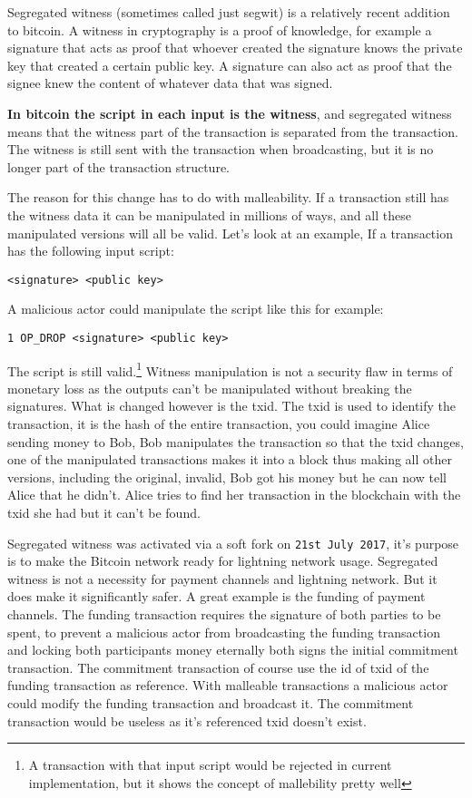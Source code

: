 Segregated witness (sometimes called just segwit) is a relatively recent addition to bitcoin. A witness in cryptography is a proof of knowledge, for example a signature that acts as proof that whoever created the signature knows the private key that created a certain public key. A signature can also act as proof that the signee knew the content of whatever data that was signed.

\textbf{In bitcoin the script in each input is the witness}, and segregated witness means that the witness part of the transaction is separated from the transaction. The witness is still sent with the transaction when broadcasting, but it is no longer part of the transaction structure.

The reason for this change has to do with malleability. If a transaction still has the witness data it can be manipulated in millions of ways, and all these manipulated versions will all be valid. Let's look at an example, If a transaction has the following input script:

\texttt{<signature> <public key>}

A malicious actor could manipulate the script like this for example:

\texttt{1 OP\_DROP <signature> <public key>}

The script is still valid.\footnote{A transaction with that input script would be rejected in current implementation, but it shows the concept of mallebility pretty well} Witness manipulation is not a security flaw in terms of monetary loss as the outputs can't be manipulated without breaking the signatures. What is changed however is the txid. The txid is used to identify the transaction, it is the hash of the entire transaction, you could imagine Alice sending money to Bob, Bob manipulates the transaction so that the txid changes, one of the manipulated transactions makes it into a block thus making all other versions, including the original, invalid, Bob got his money but he can now tell Alice that he didn't. Alice tries to find her transaction in the blockchain with the txid she had but it can't be found.

Segregated witness was activated via a soft fork on \texttt{21st July 2017}, it's purpose is to make the Bitcoin network ready for lightning network usage. Segregated witness is not a necessity for payment channels and lightning network. But it does make it significantly safer. A great example is the funding of payment channels. The funding transaction requires the signature of both parties to be spent, to prevent a malicious actor from broadcasting the funding transaction and locking both participants money eternally both signs the initial commitment transaction. The commitment transaction of course use the id of txid of the funding transaction as reference. With malleable transactions a malicious actor could modify the funding transaction and broadcast it. The commitment transaction would be useless as it's referenced txid doesn't exist.

